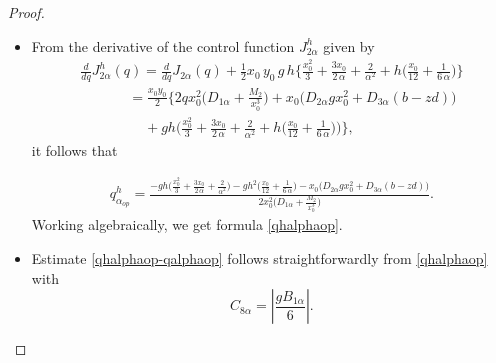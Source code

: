 \documentclass[11pt]{article}
\begin{document}
    \begin{proof} $ $
    
    
    
    \begin{itemize}
    \item[(a)]From the derivative of the control function ${ J^h_{2 \alpha}}$ given by
     \begin{equation*}
  \begin{array}{ll}
  { \frac{d}{dq} J^h_{2 \alpha}}(q)= {\frac{d}{dq}J_{2\alpha}}(q) + \tfrac{1}{2} x_0\,y_0 \,g \,h \Big \{   \tfrac{ x_0^2}{3} 
    + \tfrac{3 x_0 }{2\,\alpha} + \tfrac{2}{\alpha^2}
    + h \Big( \tfrac{x_0}{12} + \tfrac{1}{6\,\alpha} \Big) \Big\}\\[0.45cm] 
   \qquad \quad \ \ =\frac{x_0 y_0}{2} \Big\{2qx_0^2 \Big( D_{1\alpha}+\frac{M_2}{x_0^3}\Big) +x_0 \Big(D_{2\alpha} g x_0^2+ D_{3\alpha} (b-zd) \Big)\\[0.45cm]
   \qquad \qquad \; \; +gh\Big(   \tfrac{ x_0^2}{3} + \tfrac{3 x_0 }{2\,\alpha} + \tfrac{2}{\alpha^2}
    + h \Big( \tfrac{x_0}{12} + \tfrac{1}{6\,\alpha} \Big)\Big)\Big\},
    \end{array}
    \end{equation*}
    it follows that
    
      \begin{equation*}
  \begin{array}{ll}
  { q^h_{\alpha_{op}}}=  \frac{- gh\Big(   \tfrac{ x_0^2}{3} 
    + \tfrac{3 x_0 }{2\,\alpha} + \tfrac{2}{\alpha^2}\Big)-g h^2\Big( \tfrac{x_0}{12} + \tfrac{1}{6\,\alpha} \Big)- x_0 \Big(D_{2\alpha} g x_0^2+ D_{3\alpha} (b-zd) \Big)}{2x_0^2  \Big( D_{1\alpha}+\frac{M_2}{x_0^3}\Big)}.
    \end{array}
    \end{equation*}
    Working algebraically, we get formula \eqref{qhalphaop}.
    
    \item[(b)] Estimate  \eqref{qhalphaop-qalphaop} follows straightforwardly from \eqref{qhalphaop} with
    $$C_{8\alpha}=\left\lvert  \frac{g B_{1\alpha}}{6}\right\rvert.$$
    

\end{itemize}
\end{proof}
\end{document}
